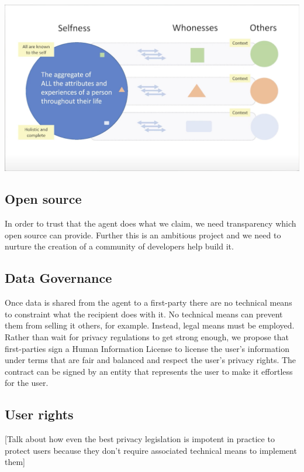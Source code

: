 \documentclass[11pt, oneside]{article}   	%
\begin{document}
\includegraphics[width=\textwidth]{./images/selfness-and-whoness-larger.png}

\subsection{Open source}

In order to trust that the agent does what we claim, we need transparency which open source can provide. Further this is an ambitious project and we need to nurture the creation of a community of developers help build it.

\subsection{Data Governance}

Once data is shared from the agent to a first-party there are no technical means to constraint what the recipient does with it. No technical means can prevent them from selling it others, for example. Instead, legal means must be employed. Rather than wait for privacy regulations to get strong enough, we propose that first-parties sign a Human Information License to license the user's information under terms that are fair and balanced and respect the user's privacy rights. The contract can be signed by an entity that represents the user to make it effortless for the user.

\subsection{User rights}

[Talk about how even the best privacy legislation is impotent in practice to protect users because they don't require associated technical means to implement them]
\end{document}
